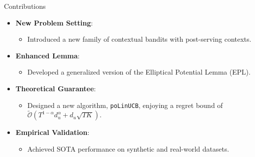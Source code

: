 \documentclass[10pt, xcolor=x11names,compress]{beamer}
\begin{document}
\begin{frame}{Contributions}
\begin{itemize}
    \item \textbf{New Problem Setting}: 
    \begin{itemize}
        \item Introduced a new family of contextual bandits with post-serving contexts.
    \end{itemize}
    \item \textbf{Enhanced Lemma}: 
    \begin{itemize}
        \item Developed a generalized version of the Elliptical Potential Lemma (EPL).
    \end{itemize}
    \item \textbf{Theoretical Guarantee}: 
    \begin{itemize}
        \item Designed a new algorithm, \texttt{poLinUCB}, enjoying a regret bound of \( \widetilde{\mathcal{O}}(T^{1-\alpha}d_u^{\alpha} + d_u\sqrt{T K })\).
    \end{itemize}
    \item \textbf{Empirical Validation}: 
    \begin{itemize}
        \item Achieved SOTA performance on synthetic and real-world datasets.
    \end{itemize}
\end{itemize}



\end{frame}
\end{document}
